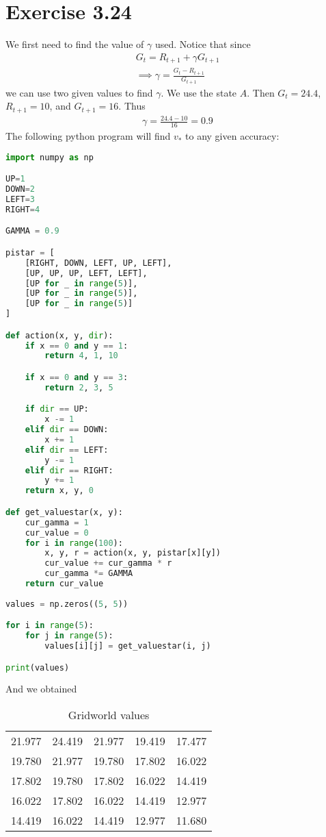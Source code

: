 \documentclass[a4paper,11pt,reqno]{amsart}
\begin{document}
\section*{Exercise 3.24}
We first need to find the value of $\gamma $ used. Notice that since 
\begin{align}
G_t = R_{t + 1} + \gamma G_{t + 1}\\
\implies \gamma  = \frac{G_t - R_{t + 1}}{G_{t + 1}}
\end{align}
we can use two given values to find $\gamma $. We use the state $A$. Then $G_t = 24.4$, $R_{t + 1} = 10$, and $G_{t + 1} = 16$. Thus
\begin{align}
\gamma  = \frac{24.4 - 10}{16} = 0.9
\end{align}
The following python program will find $v_{*}$ to any given accuracy:
\begin{lstlisting}[language=python]
import numpy as np

UP=1
DOWN=2
LEFT=3
RIGHT=4

GAMMA = 0.9

pistar = [
    [RIGHT, DOWN, LEFT, UP, LEFT], 
    [UP, UP, UP, LEFT, LEFT], 
    [UP for _ in range(5)],
    [UP for _ in range(5)],
    [UP for _ in range(5)]
]

def action(x, y, dir):
    if x == 0 and y == 1:
        return 4, 1, 10

    if x == 0 and y == 3:
        return 2, 3, 5

    if dir == UP:
        x -= 1
    elif dir == DOWN:
        x += 1
    elif dir == LEFT:
        y -= 1
    elif dir == RIGHT:
        y += 1
    return x, y, 0

def get_valuestar(x, y):
    cur_gamma = 1
    cur_value = 0
    for i in range(100):
        x, y, r = action(x, y, pistar[x][y])
        cur_value += cur_gamma * r
        cur_gamma *= GAMMA
    return cur_value
        
values = np.zeros((5, 5))

for i in range(5):
    for j in range(5):
        values[i][j] = get_valuestar(i, j)

print(values)

\end{lstlisting}
And we obtained
\begin{table}[htpb]
    \centering
    \caption{Gridworld values}
    \label{tab:label}

\begin{tabular}{|rrrrr|}
\hline
21.977 & 24.419 & 21.977 & 19.419 & 17.477 \\
19.780 & 21.977 & 19.780 & 17.802 & 16.022 \\
17.802 & 19.780 & 17.802 & 16.022 & 14.419 \\
16.022 & 17.802 & 16.022 & 14.419 & 12.977 \\
14.419 & 16.022 & 14.419 & 12.977 & 11.680 \\
\hline
        
    \end{tabular}
\end{table}
\end{document}

